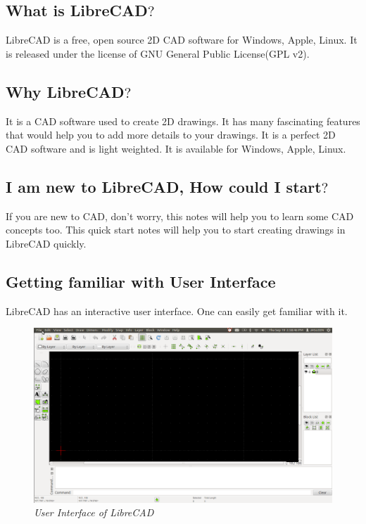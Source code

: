 \vspace{5 mm}  %
\subsection*{What is LibreCAD$?$}
LibreCAD is a free, open source 2D CAD software for Windows, Apple, Linux. It is released under the license of  GNU General Public License(GPL v2).
\subsection*{Why LibreCAD$?$}
It is a CAD software used to create 2D drawings. It has many fascinating features that would help you to add more details to your drawings. It is a perfect 2D CAD software and is light weighted. It is available for Windows, Apple, Linux.
\subsection*{I am new to LibreCAD, How could I start$?$}
If you are new to CAD, don't worry, this notes will help you to learn some CAD concepts too. This quick start notes will help you to start creating drawings in LibreCAD quickly.\\
\subsection*{Getting familiar with User Interface}
LibreCAD has an interactive user interface. One can easily get familiar with it.
\begin{figure}[h!]
\centering\includegraphics[width=450px]{./images/screen.png}
\caption{\small \sl User Interface of LibreCAD}
\end{figure}\\
%
